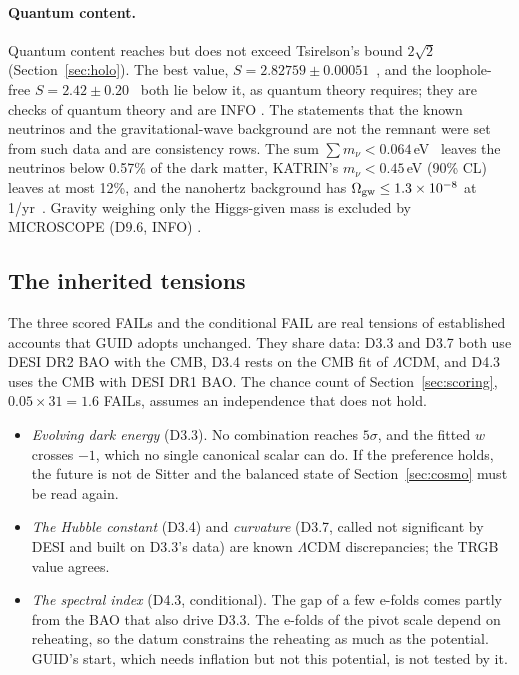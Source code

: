 \paragraph{Quantum content.} Quantum content reaches but does not exceed Tsirelson's bound $2\sqrt2$ (Section~\ref{sec:holo}). The best value,
$S=2.82759\pm0.00051$~\cite{poh2015}, and the loophole-free $S=2.42\pm0.20$~\cite{hensen2015} both lie below it, as quantum theory requires; they
are checks of quantum theory and are INFO . The statements that the known neutrinos and the gravitational-wave background are not the remnant were set
from such data and are consistency rows. The sum $\sum m_\nu<0.064$\,eV~\cite{desi2} leaves the neutrinos below 0.57\% of the dark matter,
KATRIN's $m_\nu<0.45$\,eV (90\% CL)~\cite{katrin2025} leaves at most 12\%, and the nanohertz background has $\Omega_{\rm gw}\le1.3\times10^{-8}$
at 1/yr~\cite{nanograv}. Gravity weighing only the Higgs-given mass is excluded by MICROSCOPE (D9.6, INFO) .

\subsection{The inherited tensions}\label{sec:data-tensions}

The three scored FAILs and the conditional FAIL are real tensions of established accounts that GUID adopts unchanged. They share data: D3.3
and D3.7 both use DESI DR2 BAO with the CMB, D3.4 rests on the CMB fit of $\Lambda$CDM, and D4.3 uses the CMB with DESI DR1 BAO. The chance
count of Section~\ref{sec:scoring}, $0.05\times31=1.6$ FAILs, assumes an independence that does not hold.
\begin{itemize}[nosep,leftmargin=*]
\item \emph{Evolving dark energy} (D3.3). No combination reaches $5\sigma$, and the fitted $w$ crosses $-1$, which no single canonical scalar
can do. If the preference holds, the future is not de Sitter and the balanced state of Section~\ref{sec:cosmo} must be read again.
\item \emph{The Hubble constant} (D3.4) and \emph{curvature} (D3.7, called not significant by DESI and built on D3.3's data) are known
$\Lambda$CDM discrepancies; the TRGB value agrees.
\item \emph{The spectral index} (D4.3, conditional). The gap of a few e-folds comes partly from the BAO that also drive D3.3. The e-folds of the
pivot scale depend on reheating, so the datum constrains the reheating as much as the potential. GUID's start, which needs inflation but not
this potential, is not tested by it.
\end{itemize}

